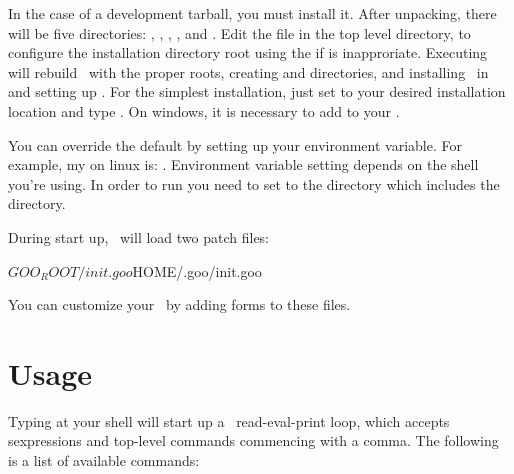 \documentclass[twoside,twocolumn,9pt]{extarticle}
\begin{document}
In the case of a development tarball, you must install it.
After unpacking, there will be five directories: ,
, , , and .  Edit the
 file in the top level directory, to configure the
installation directory root using the  if  is
inapproriate.  Executing  will rebuild \goo\ with
the proper roots, creating  and  directories, and
installing \goo\ in  and setting up .  For the
simplest installation, just set  to your desired
installation location and type .  On
windows, it is necessary to add  to your .

You can override the default  by
setting up your  environment variable.  
For example, my  on linux is: 
.
Environment variable setting depends on the shell you're using.
In order to run  you need to
set  to the directory which includes the 
directory.  

During start up, \goo\ will load two patch files:

\begin{exv}
${GOO_ROOT}/init.goo
${HOME}/.goo/init.goo
\end{exv}

You can customize your \goo\ by adding forms to these files.

\section{Usage}

Typing  at your shell will start up a \goo\ read-eval-print
loop, which accepts sexpressions and top-level commands commencing
with a comma.  The following is a list of available commands:

\begin{defs}
\end{defs}
\end{document}
